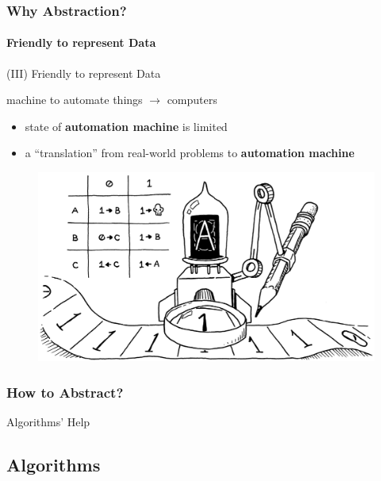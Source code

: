 \documentclass[11pt]{beamer}
\begin{document}
	\begin{frame}
		\frametitle{Why Abstraction?}
		\framesubtitle{Friendly to represent Data}
		
		(III) Friendly to represent Data

		machine to automate things $\rightarrow$ computers 

		\begin{itemize}
			\item state of \textbf{automation machine} is limited
			\item a ``translation'' from real-world problems to \textbf{automation machine}
		\end{itemize}

		\begin{figure}
			\includegraphics[scale=0.2]{turing-machine.png}
		\end{figure}
	
	\end{frame}

	\begin{frame}
		\frametitle{How to Abstract?}
	
		\begin{center}
			\Huge{Algorithms' Help}
		\end{center}
	
	\end{frame}

	\subsection{Algorithms}
\end{document}
